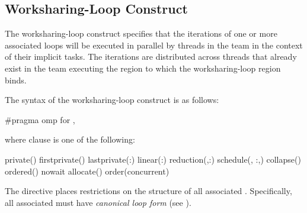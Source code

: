 \subsection{Worksharing-Loop Construct}
\label{subsec:Worksharing-Loop Construct}
\summary
The worksharing-loop construct specifies that the iterations of one or more associated loops will be
executed in parallel by threads in the team in the context of their implicit tasks. The
iterations are distributed across threads that already exist in the team executing the
 region to which the worksharing-loop region binds.

\syntax
\begin{ccppspecific}
The syntax of the worksharing-loop construct is as follows:

\begin{ompcPragma}
#pragma omp for \plc{[clause[ [},\plc{] clause] ... ] new-line}
\end{ompcPragma}

where clause is one of the following:

{}
\begin{indentedcodelist}
private()
firstprivate()
lastprivate(\plc{[ lastprivate-modifier}:\plc{] list})
linear(\plc{list[ }:\plc{ linear-step]})
reduction(\plc{[ reduction-modifier},\plc{]reduction-identifier }:)
schedule(\plc{[modifier [}, \plc{modifier]}:\plc{]kind[},\plc{ chunk_size]})
collapse()
ordered\plc{[}()\plc{]}
nowait
allocate(\plc{[allocator: ]})
order(concurrent)
\end{indentedcodelist}

The  directive places restrictions on the structure of all associated .
Specifically, all associated  must have \emph{canonical loop form} (see
).
\end{ccppspecific}

